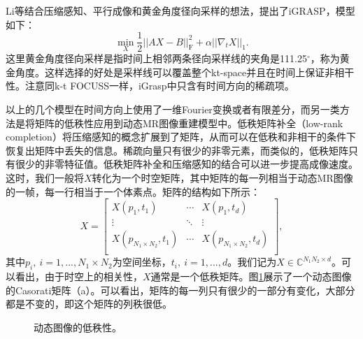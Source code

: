 Li等结合压缩感知、平行成像和黄金角度径向采样的想法，提出了iGRASP\cite{igrasp}，模型如下：
\begin{equation}
	\min_X\frac{1}{2}||AX-B||_\mathrm{F}^2+\alpha||\nabla_t X||_1.
\end{equation}
这里黄金角度径向采样是指时间上相邻两条径向采样线的夹角是111.25$^{\circ}$，称为黄金角度。这样选择的好处是采样线可以覆盖整个kt-space并且在时间上保证非相干性。注意同k-t FOCUSS一样，iGrasp中只含有时间方向的稀疏项。

以上的几个模型在时间方向上使用了一维Fourier变换或者有限差分，而另一类方法是将矩阵的低秩性应用到动态MR图像重建模型中。低秩矩阵补全\cite{candes2009exact}（low-rank completion）将压缩感知的概念扩展到了矩阵，从而可以在低秩和非相干的条件下恢复出矩阵中丢失的信息。稀疏向量只有很少的非零元素，而类似的，低秩矩阵只有很少的非零特征值。低秩矩阵补全和压缩感知的结合可以进一步提高成像速度。这时，我们一般将$X$转化为一个时空矩阵，其中矩阵的每一列相当于动态MR图像的一帧，每一行相当于一个体素点。矩阵的结构如下所示：
\begin{equation}
X = 
\left[              
  \begin{array}{ccc}   
    X(p_1,t_1) & \cdots & X(p_1,t_{d})\\ 
    \vdots &\ddots & \vdots\\
    X(p_{N_1\times N_2},t_1) & \cdots & X(p_{N_1\times N_2},t_{d})\\  
  \end{array}
\right],                 
\end{equation}
其中$p_i,\ i=1,...,N_1\times N_2$为空间坐标，$t_i,\ i=1,...,d$。我们记为$X\in \mathbb{C}^{N_1N_2\times d}$。可以看出，由于时空上的相关性，$X$通常是一个低秩矩阵。图\ref{fig:lowrank}展示了一个动态图像的Casorati矩阵（a）。可以看出，矩阵的每一列只有很少的一部分有变化，大部分都是不变的，即这个矩阵的列秩很低。
\begin{figure}[htbp]
\centering
{}
\centering
\caption{动态图像的低秩性。}
\label{fig:lowrank}
\end{figure}


